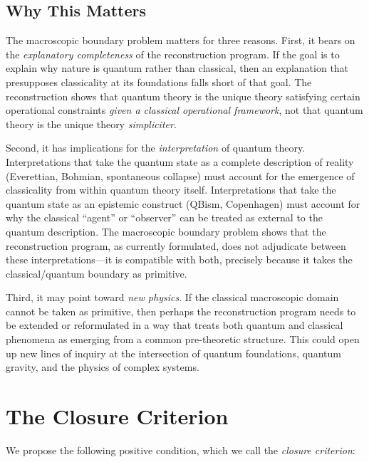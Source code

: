 \documentclass[pdflatex,sn-mathphys-num]{sn-jnl}%
\begin{document}
\subsection{Why This Matters}

The macroscopic boundary problem matters for three reasons. First, it bears on the \emph{explanatory completeness} of the reconstruction program. If the goal is to explain why nature is quantum rather than classical, then an explanation that presupposes classicality at its foundations falls short of that goal. The reconstruction shows that quantum theory is the unique theory satisfying certain operational constraints \emph{given a classical operational framework}, not that quantum theory is the unique theory \emph{simpliciter}.

Second, it has implications for the \emph{interpretation} of quantum theory. Interpretations that take the quantum state as a complete description of reality (Everettian, Bohmian, spontaneous collapse) must account for the emergence of classicality from within quantum theory itself. Interpretations that take the quantum state as an epistemic construct (QBism, Copenhagen) must account for why the classical ``agent'' or ``observer'' can be treated as external to the quantum description. The macroscopic boundary problem shows that the reconstruction program, as currently formulated, does not adjudicate between these interpretations---it is compatible with both, precisely because it takes the classical/quantum boundary as primitive.

Third, it may point toward \emph{new physics}. If the classical macroscopic domain cannot be taken as primitive, then perhaps the reconstruction program needs to be extended or reformulated in a way that treats both quantum and classical phenomena as emerging from a common pre-theoretic structure. This could open up new lines of inquiry at the intersection of quantum foundations, quantum gravity, and the physics of complex systems.

\section{The Closure Criterion}\label{sec4}

We propose the following positive condition, which we call the \emph{closure criterion}:
\end{document}

